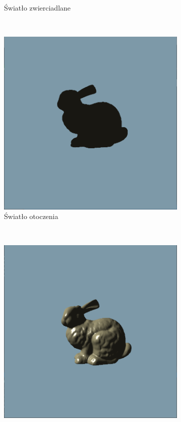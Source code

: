 \documentclass[a4paper,twoside,12pt]{book}
\begin{document}
\begin{figure}[H]
\begin{subfigure}[b]{0.3\textwidth}
        \caption{Światło zwierciadlane}
        \label{fig:sum_specular}
    \end{subfigure}
    ~ %
    \begin{subfigure}[b]{0.3\textwidth}
        \includegraphics[width=\textwidth]{res/sum_ambient.png}
        \caption{Światło otoczenia}
        \label{fig:sum_ambient}
    \end{subfigure}
    ~ %
    \begin{subfigure}[b]{0.5\textwidth}
        \includegraphics[width=\textwidth]{res/sum_lights.png}

\end{subfigure}
\end{figure}
\end{document}
